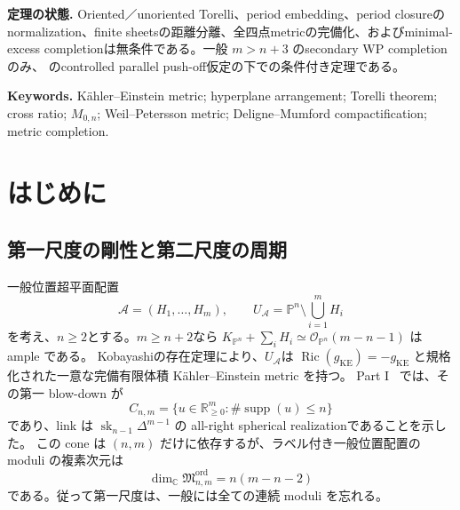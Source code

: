 \documentclass[11pt,a4paper]{ltjsarticle}
\newcommand{\PP}{\mathbb P}
\newcommand{\RR}{\mathbb R}
\newcommand{\CC}{\mathbb C}
\newcommand{\Ric}{\operatorname{Ric}}
\newcommand{\supp}{\operatorname{supp}}
\newcommand{\Norm}{\operatorname{Norm}}
\newcommand{\ov}{\overline}
\newcommand{\cA}{\mathcal A}
\newcommand{\Mord}{\mathfrak M^{\mathrm{ord}}}
\theoremstyle{plain}
\theoremstyle{definition}
\theoremstyle{remark}
\begin{document}
\begin{abstract}
有限 period mapの同じ target point上にある異なる sheetsは、product Weil--Petersson ballから一度出る必要があることにより、pullback length distanceで無条件に正の距離を保つ。一方、各 normalization pointの一枝全体が一つの completion pointへ収縮するためには、log resolutionの exceptional fibreに沿う pathsを一様に制御して境界補集合へ押し出す controlled parallel push-off が必要である。本稿はこの性質を明示的な仮定として切り出し、その仮定の下で
\[
 \widehat{(\Mord_{n,m},d_{\mathrm{sec}})}
 \simeq \Norm(Z_{n,m}^{\mathrm{curv}})
 \simeq \ov{\mathbf X}(n+1,m)^\nu
\]
を得る。さらに任意の $N\ge4$ について、全四点忘却写像から作る $g_{\mathrm{cr}}$ の completion が stratum-preserving に $\ov M_{0,N}$ であること、および $\rho_e=(-\log|t_e|)^{-1/2}<\varepsilon$ と stratum coordinates の $\varepsilon$-近傍で定める plumbing neighborhood の内在直径が $O(\varepsilon)$ であることを無条件に示す。Minimal-excess case $m=n+3$ では Gale dualityによりこの明示的定理を適用できるため、$\ov M_{0,n+3}$ への secondary completionは controlled push-off 仮定なしで成立する。
\end{abstract}

\medskip
\noindent\textbf{定理の状態.}
Oriented／unoriented Torelli、period embedding、period closureのnormalization、finite sheetsの距離分離、全四点metricの完備化、およびminimal-excess completionは無条件である。一般 $m>n+3$ のsecondary WP completionのみ、 のcontrolled parallel push-off仮定の下での条件付き定理である。

\medskip
\noindent\textbf{Keywords.}
K\"ahler--Einstein metric; hyperplane arrangement; Torelli theorem; cross ratio; $M_{0,n}$; Weil--Petersson metric; Deligne--Mumford compactification; metric completion.

\tableofcontents

\section{はじめに}
\label{sec:introduction}

\subsection{第一尺度の剛性と第二尺度の周期}
一般位置超平面配置
\[
 \cA=(H_1,\ldots,H_m),\qquad
 U_{\cA}=\PP^n\setminus\bigcup_{i=1}^mH_i
\]
を考え、$n\ge2$とする。$m\ge n+2$なら
$K_{\PP^n}+\sum_iH_i\simeq\mathcal O_{\PP^n}(m-n-1)$ は ample である。
Kobayashiの存在定理\cite[Theorem~1, pp.~399--400]{Kobayashi}により、$U_{\cA}$は
$\Ric(g_{\mathrm{KE}})=-g_{\mathrm{KE}}$ と規格化された一意な完備有限体積 K\"ahler--Einstein metric を持つ。
Part I~\cite{UedaI} では、その第一 blow-down が
\begin{equation}
\label{eq:intro-firstcone}
 C_{n,m}=\{u\in\RR_{\ge0}^m:\#\supp(u)\le n\}
\end{equation}
であり、link は $\operatorname{sk}_{n-1}\Delta^{m-1}$ の all-right spherical realizationであることを示した。
この cone は $(n,m)$ だけに依存するが、ラベル付き一般位置配置の moduli の複素次元は
\begin{equation}
\label{eq:intro-dim}
 \dim_{\CC}\Mord_{n,m}=n(m-n-2)
\end{equation}
である。従って第一尺度は、一般には全ての連続 moduli を忘れる。
\end{document}
